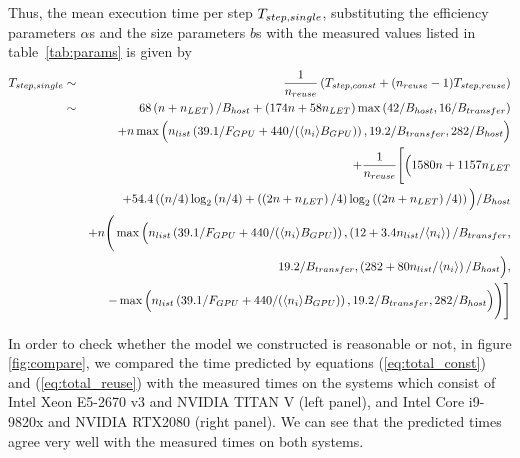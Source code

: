 \documentclass[dvipdfmx]{pasj01}
\begin{document}
Thus, the mean execution time per step $T_{\rm step, single}$,
substituting the efficiency parameters $\alpha$s and the size
parameters $b$s with the measured values listed in
table~\ref{tab:params} is given by
\begin{eqnarray}
  T_{\rm step, single} & \sim & \frac{1}{n_{\rm reuse}}\left( T_{\rm step, const} + (n_{\rm reuse}-1)T_{\rm step, reuse} \right) \nonumber \\
  &\sim & 68\left(n+n_{\rm LET} \right)/B_{\rm host} + \left( 174n + 58n_{\rm LET} \right) \max \left( 42/B_{\rm host}, 16/B_{\rm transfer} \right) \nonumber \\
  && + n \max \Big( n_{\rm list} \left( 39.1/F_{\rm GPU} + 440/(\langle n_i \rangle B_{\rm GPU}) \right), 19.2/B_{\rm transfer}, 282 / B_{\rm host} \Big) \nonumber \\
  && + \frac{1}{n_{\rm reuse}} \Bigg[ \Big( 1580n + 1157n_{\rm LET} \nonumber \\
  &&  + 54.4 \left( \left( n/4 \right) \log_2\left( n/4\right) + \left( \left(2n+n_{\rm LET}\right)/4 \right) \log_2\left( \left(2n+n_{\rm LET}\right)/4\right) \right) \Big) / B_{\rm host} \nonumber \\
    &&  + n \Bigg( \max \Big( n_{\rm list} \left( 39.1/F_{\rm GPU} + 440/(\langle n_i \rangle B_{\rm GPU}) \right), 
    \left( 12 + 3.4 n_{\rm list}/\langle n_i \rangle  \right) / B_{\rm transfer}, \nonumber \\
    && 19.2/B_{\rm transfer}, \left( 282 + 80n_{\rm list}/\langle n_i \rangle \right) / B_{\rm host} \Big), \nonumber \\
    && - \max \Big( n_{\rm list} \left( 39.1/F_{\rm GPU} + 440/(\langle n_i \rangle B_{\rm GPU}) \right),
    19.2/B_{\rm transfer}, 282 / B_{\rm host} \Big) \Bigg) \Bigg]
    \label{eq:total_single}
\end{eqnarray}

In order to check whether the model we constructed is reasonable or
not, in figure \ref{fig:compare}, we compared the time predicted by
equations (\ref{eq:total_const}) and (\ref{eq:total_reuse}) with the
measured times on the systems which consist of Intel Xeon E5-2670 v3
and NVIDIA TITAN V (left panel), and Intel Core i9-9820x and
NVIDIA RTX2080 (right panel). We can see that the predicted
times agree very well with the measured times on both systems.

\end{document}
